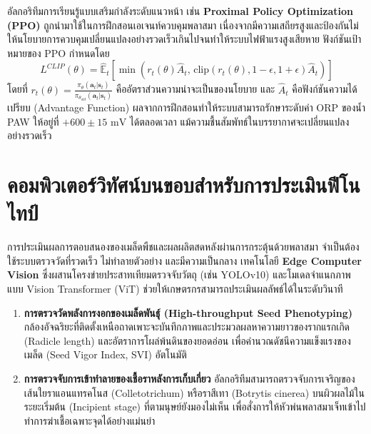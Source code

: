 อัลกอริทึมการเรียนรู้แบบเสริมกำลังระดับแนวหน้า เช่น \textbf{Proximal Policy Optimization (PPO)} ถูกนำมาใช้ในการฝึกสอนเอเจนท์ควบคุมพลาสมา เนื่องจากมีความเสถียรสูงและป้องกันไม่ให้นโยบายการควบคุมเปลี่ยนแปลงอย่างรวดเร็วเกินไปจนทำให้ระบบไฟฟ้าแรงสูงเสียหาย ฟังก์ชันเป้าหมายของ PPO กำหนดโดย
\begin{equation}
    L^{CLIP}(\theta) = \widehat{\mathbb{E}}_t \left[ \min\left( r_t(\theta)\widehat{A}_t, \, \text{clip}(r_t(\theta), 1-\epsilon, 1+\epsilon)\widehat{A}_t \right) \right]
\end{equation}
โดยที่ $r_t(\theta) = \frac{\pi_\theta(\mathbf{a}_t|\mathbf{s}_t)}{\pi_{\theta_{old}}(\mathbf{a}_t|\mathbf{s}_t)}$ คืออัตราส่วนความน่าจะเป็นของนโยบาย และ $\widehat{A}_t$ คือฟังก์ชันความได้เปรียบ (Advantage Function) ผลจากการฝึกสอนทำให้ระบบสามารถรักษาระดับค่า ORP ของน้ำ PAW ให้อยู่ที่ $+600\pm15\text{ mV}$ ได้ตลอดเวลา แม้ความชื้นสัมพัทธ์ในบรรยากาศจะเปลี่ยนแปลงอย่างรวดเร็ว

\section{คอมพิวเตอร์วิทัศน์บนขอบสำหรับการประเมินฟีโนไทป์}

การประเมินผลการตอบสนองของเมล็ดพืชและผลผลิตสดหลังผ่านการกระตุ้นด้วยพลาสมา จำเป็นต้องใช้ระบบตรวจวัดที่รวดเร็ว ไม่ทำลายตัวอย่าง และมีความเป็นกลาง เทคโนโลยี \textbf{Edge Computer Vision} ซึ่งผสานโครงข่ายประสาทเทียมตรวจจับวัตถุ (เช่น YOLOv10) และโมเดลจำแนกภาพแบบ Vision Transformer (ViT) ช่วยให้เกษตรกรสามารถประเมินผลลัพธ์ได้ในระดับวินาที

\begin{enumerate}
    \item \textbf{การตรวจวัดพลังการงอกของเมล็ดพันธุ์ (High-throughput Seed Phenotyping)} กล้องอัจฉริยะที่ติดตั้งเหนือถาดเพาะจะบันทึกภาพและประมวลผลหาความยาวของรากแรกเกิด (Radicle length) และอัตราการโผล่พ้นดินของยอดอ่อน เพื่อคำนวณดัชนีความแข็งแรงของเมล็ด (Seed Vigor Index, SVI) อัตโนมัติ
    \item \textbf{การตรวจจับการเข้าทำลายของเชื้อราหลังการเก็บเกี่ยว} อัลกอริทึมสามารถตรวจจับการเจริญของเส้นใยราแอนแทรคโนส (Colletotrichum) หรือราสีเทา (Botrytis cinerea) บนผิวผลไม้ในระยะเริ่มต้น (Incipient stage) ที่ตามนุษย์ยังมองไม่เห็น เพื่อสั่งการให้หัวพ่นพลาสมาเจ็ทเข้าไปทำการฆ่าเชื้อเฉพาะจุดได้อย่างแม่นยำ
\end{enumerate}

